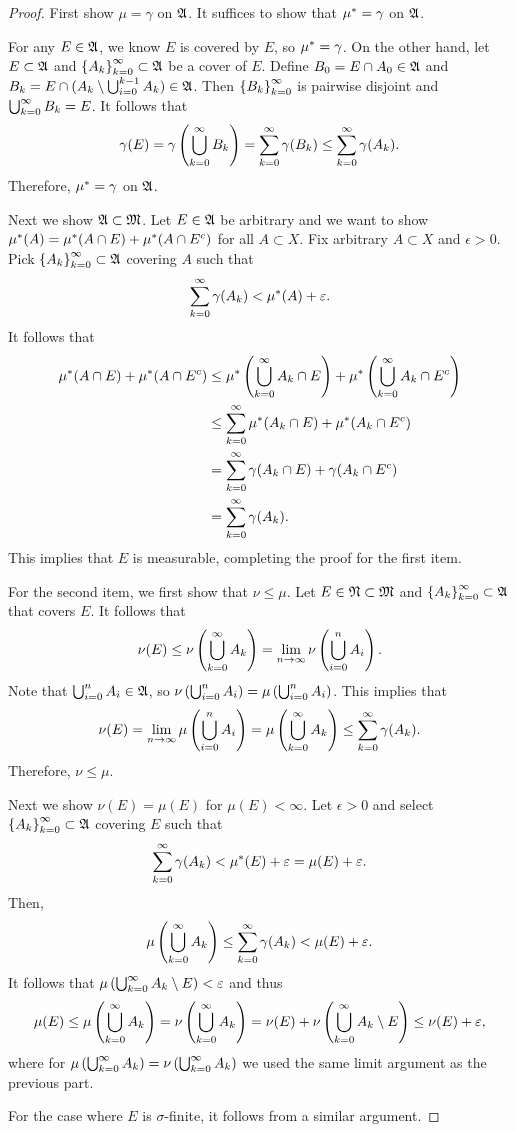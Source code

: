 \documentclass[a4paper]{article}
\begin{document}
\begin{proof}
First show $\mu = \gamma$ on $\mathfrak{A}$. 
It suffices to show that $\mu^* = \gamma$ on $\mathfrak{A}$.

For any $E \in \mathfrak{A}$, we know $E$ is covered by $E$, so 
$\mu^* = \gamma$. On the other hand, let $E \subset \mathfrak{A}$
and $\left\{ A_k \right\}_{k=0}^\infty \subset \mathfrak{A}$ be a cover of $E$.
Define $B_0 = E \cap A_0 \in \mathfrak{A}$ and 
$B_k = E \cap (A_k \setminus \bigcup_{i=0}^{k-1} A_k) \in \mathfrak{A}$.
Then $\left\{ B_k \right\}_{k=0}^\infty$ is pairwise disjoint and 
$\bigcup_{k=0}^\infty B_k = E$. It follows that 
\[
\gamma(E) = \gamma \left( \bigcup_{k=0}^\infty B_k \right)
= \sum_{k=0}^\infty \gamma(B_k) \leq \sum_{k=0}^\infty \gamma(A_k).
\]
Therefore, $\mu^* = \gamma$ on $\mathfrak{A}$. 

Next we show $\mathfrak{A} \subset \mathfrak{M}$. Let $E \in \mathfrak{A}$
be arbitrary and we want to show $\mu^*(A) 
= \mu^*(A \cap E) + \mu^* (A \cap E^c)$ for all 
$A \subset X$. Fix arbitrary $A \subset X$ and 
$\epsilon > 0$. Pick $\left\{ A_k \right\}_{k=0}^\infty \subset \mathfrak{A}$
covering $A$ such that 
\[
\sum_{k=0}^\infty \gamma (A_k) < \mu^*(A) + \varepsilon.
\]
It follows that 
\[
\begin{aligned}
\mu^*(A \cap E) + \mu^*(A \cap E^c) 
&\leq \mu^* \left( \bigcup_{k=0}^\infty A_k \cap E \right)
+ \mu^* \left( \bigcup_{k=0}^\infty A_k \cap E^c \right) \\ 
&\leq \sum_{k=0}^\infty \mu^*(A_k \cap E) + \mu^*(A_k \cap E^c) \\
&= \sum_{k=0}^\infty \gamma(A_k \cap E) + \gamma(A_k \cap E^c) \\
&= \sum_{k=0}^\infty \gamma(A_k).
\end{aligned}
\]
This implies that $E$ is measurable, completing the proof 
for the first item.

For the second item, we first show that $\nu \leq \mu$.
Let $E \in \mathfrak{N} \subset \mathfrak{M}$ and $\left\{ A_k \right\}_{k=0}^\infty \subset \mathfrak{A}$ 
that covers $E$. It follows that 
\[
\nu(E) \leq \nu \left( \bigcup_{k=0}^\infty A_k \right)
= \lim_{n \to \infty} \nu \left( \bigcup_{i=0}^n A_i \right).
\]
Note that $\bigcup_{i=0}^n A_i \in \mathfrak{A}$, so 
$\nu \left( \bigcup_{i=0}^n A_i \right) = \mu \left( \bigcup_{i=0}^n 
A_i \right)$. This implies that 
\[
\nu(E) = \lim_{n \to \infty} \mu \left( \bigcup_{i=0}^n A_i \right)
= \mu \left( \bigcup_{k=0}^\infty A_k \right) \leq \sum_{k=0}^\infty \gamma(A_k).
\]
Therefore, $\nu \leq \mu$. 

Next we show $\nu(E) = \mu(E)$ for $\mu(E) < \infty$. 
Let $\epsilon > 0$ and select $\left\{ A_k \right\}_{k=0}^\infty \subset \mathfrak{A}$
covering $E$ such that 
\[
\sum_{k=0}^\infty \gamma(A_k) < \mu^*(E) + \varepsilon = \mu(E) + \varepsilon.
\]
Then, 
\[
\mu \left( \bigcup_{k=0}^\infty A_k \right) 
\leq \sum_{k=0}^\infty \gamma(A_k) < \mu(E) + \varepsilon.
\]
It follows that $\mu \left( \bigcup_{k=0}^\infty A_k \setminus E \right)
< \varepsilon$ and thus 
\[
\begin{aligned}
\mu(E) 
\leq \mu \left( \bigcup_{k=0}^\infty A_k \right) 
= \nu \left( \bigcup_{k=0}^\infty A_k \right) 
= \nu (E) + \nu \left( \bigcup_{k=0}^\infty A_k \setminus E \right)
\leq \nu(E) + \varepsilon,
\end{aligned}
\]
where for $\mu \left( \bigcup_{k=0}^\infty A_k \right)
= \nu \left( \bigcup_{k=0}^\infty A_k \right)$ we used the same limit argument 
as the previous part.

For the case where $E$ is $\sigma$-finite, it follows from 
a similar argument.

\end{proof}
\end{document}
